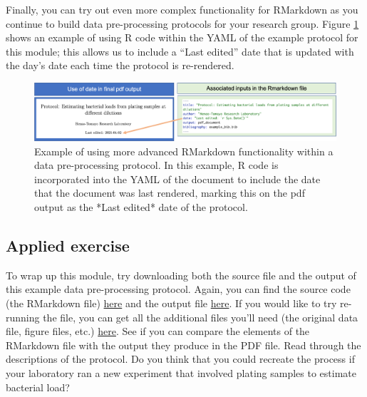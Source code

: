 \documentclass[]{tufte-book}
\begin{document}
Finally, you can try out even more complex functionality for RMarkdown as you
continue to build data pre-processing protocols for your research group. Figure
\ref{fig:protocolyaml} shows an example of using R code within the YAML of the
example protocol for this module; this allows us to include a ``Last edited'' date
that is updated with the day's date each time the protocol is re-rendered.

\begin{figure}
\includegraphics[width=\textwidth]{figures/protocol_yaml_date} \caption[Example of using more advanced RMarkdown functionality within a data pre-processing protocol]{Example of using more advanced RMarkdown functionality within a data pre-processing protocol. In this example, R code is incorporated into the YAML of the document to include the date that the document was last rendered, marking this on the pdf output as the *Last edited* date of the protocol.}\label{fig:protocolyaml}
\end{figure}

\subsection{Applied exercise}\label{applied-exercise-1}

To wrap up this module, try downloading both the source file and the output of this example
data pre-processing protocol. Again, you can find the source code (the RMarkdown file)
\href{https://raw.githubusercontent.com/geanders/improve_repro/master/data/bactcountr_example_data/example_protocol.Rmd}{here} and the output file \href{https://github.com/geanders/improve_repro/raw/master/data/bactcountr_example_data/example_protocol.pdf}{here}. If you would like to try re-running the file, you can get all the additional files
you'll need (the original data file, figure files, etc.) \href{https://github.com/geanders/improve_repro/tree/master/data/bactcountr_example_data}{here}. See if
you can compare the elements of the RMarkdown file with the output they produce in the
PDF file. Read through the descriptions of the protocol. Do you think that you could recreate
the process if your laboratory ran a new experiment that involved plating samples to
estimate bacterial load?


\end{document}
